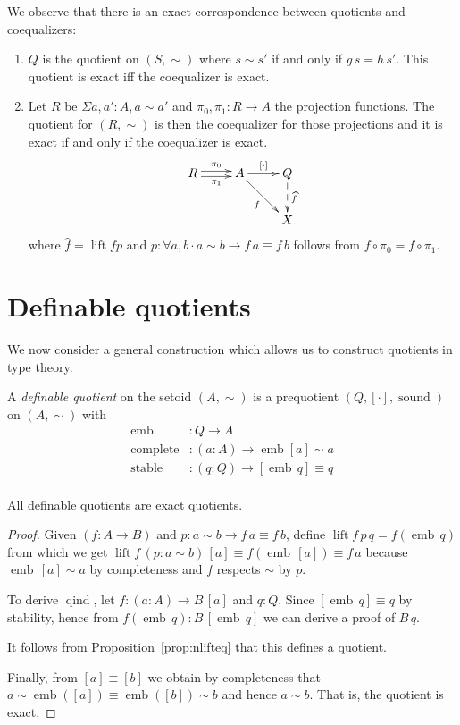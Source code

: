 \documentclass[envcountsame]{llncs}
\providecommand{\class}[1]{[#1]}
\newcommand{\dlift}[1]{\widehat{#1}}
\DeclareMathOperator{\sound}{sound}
\DeclareMathOperator{\qind}{qind}
\DeclareMathOperator{\emb}{emb}
\DeclareMathOperator{\complete}{complete}
\DeclareMathOperator{\stable}{stable}
\DeclareMathOperator{\lift}{lift}
\begin{document}
We observe that there is an exact correspondence between quotients and coequalizers:
\begin{proposition}\hfill
\begin{enumerate}
\item $Q$ is the quotient on $(S,\sim)$ where $s\sim s'$ if and only if $g\,s=h\,s'$.
This quotient is exact if{f} the coequalizer is exact.
\item Let $R$ be $\Sigma a,a':A,a\sim a'$ and $\pi_0,\pi_1 : R\to A$ the projection functions. The quotient for $(R,\sim)$ is then the coequalizer for those projections and it is exact if and only if the coequalizer is exact.
\[\xymatrix{
R\ar@<0.5ex>[r]^{\pi_0}\ar@<-0.5ex>[r]_{\pi_1}& A\ar[r]^{\class\cdot}\ar[dr]_{f} & Q\ar@{-->}[d]^{\dlift f}\\
&&X
}\]
where $\dlift f=\lift f p$ and $p \colon \forall a,b\cdot a\sim b \to f\,a \equiv f\,b$ follows from $f \circ \pi_0 = f \circ \pi_1$.
\end{enumerate}
\end{proposition}

\section{Definable quotients\\ }\label{sec:defquotients}

We now consider a general construction which allows us to construct quotients in type theory.

\begin{definition}\label{def:defquotients}
A \emph{definable quotient} on the setoid $(A,\sim)$ is a prequotient $(Q,\class\cdot,\sound)$ on $(A,\sim)$ with
\begin{align*}
\emb &: Q \to A\\
\complete &: (a : A) \to \emb {\class a} \sim a\\
\stable &: (q:Q) \to \class{\emb\,q} \equiv q\\
\end{align*}
\end{definition}

\begin{proposition}
All definable quotients are exact quotients.
\end{proposition}
\begin{proof}

Given $(f\colon A \to B)$ and $p : a\sim b \to f\,a \equiv f\,b$, define $\lift f\, p \,q = f (\emb\,q)$ from which we get $\lift f \,(p : a \sim b)\,\class a\equiv f(\emb\,\class a)\equiv f\,a$ because $\emb\,\class a\sim a$ by completeness and $f$ respects $\sim$ by $p$. 

To derive $\qind$, let $f:(a\colon A)\to B\,\class a$ and $q:Q$. Since $ \class{\emb\,q} \equiv q$ by stability, hence from $f (\emb\,q):B\,\class{\emb\,q}$ we can derive a proof of $B\,q$. 

It follows from Proposition~\ref{prop:nlifteq} that this defines a quotient. 

Finally, from $\class a \equiv \class b$ 
we obtain by completeness that $a\sim\emb(\class a)\equiv\emb(\class b)\sim b$ and hence $a\sim b$. That is, the quotient is exact.
\end{proof}
\end{document}
